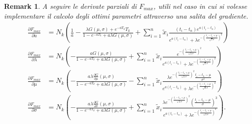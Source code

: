 \documentclass[10pt,a4paper]{report}
\newtheorem{remark}{Remark}
\begin{document}
\begin{remark}
A seguire le derivate parziali di $F_{max}$, utili nel caso in cui si volesse implementare il calcolo degli ottimi parametri attraverso una salita del gradiente.
\begin{align*}
\frac{\partial F_{max}}{\partial a} &= N_k\left(\frac{1}{a}-\frac{\lambda G(\mu,\sigma)+e^{-a T_k}T_k}{1-e^{-aT_k}+a\lambda G(\mu,\sigma)}+\sum_{i=1}^n\tilde{x}_i\frac{(t_i-t_n)e^{a(t_i-t_n)}}{e^{a(t_i-t_n)}+\lambda e^{-\left(\frac{t_i-t_n+\mu}{\sqrt{2}\sigma}\right)^2}}\right)\\
\frac{\partial F_{max}}{\partial \lambda} &= N_k\left(-\frac{a G(\mu,\sigma)}{1-e^{-aT_k}+a\lambda G(\mu,\sigma)}+\sum_{i=1}^n\tilde{x}_i\frac{e^{-\left(\frac{t_i-t_n+\mu}{\sqrt{2}\sigma}\right)^2}}{e^{a(t_i-t_n)}+\lambda e^{-\left(\frac{t_i-t_n+\mu}{\sqrt{2}\sigma}\right)^2}}\right)\\
\frac{\partial F_{max}}{\partial\mu} &= N_k\left(-\frac{a\lambda \frac{\partial G}{\partial\mu}(\mu,\sigma)}{1-e^{-aT_k}+a\lambda G(\mu,\sigma)}-\sum_{i=1}^n\tilde{x}_i\frac{\lambda e^{-\left(\frac{t_i-t_n+\mu}{\sqrt{2}\sigma}\right)^2}\frac{t_i-t_n-\mu}{\sigma^2}}{e^{a(t_i-t_n)}+\lambda e^{-\left(\frac{t_i-t_n+\mu}{\sqrt{2}\sigma}\right)^2}}\right)\\
\frac{\partial F_{max}}{\partial\sigma} &= N_k\left(-\frac{a\lambda \frac{\partial G}{\partial\sigma}(\mu,\sigma)}{1-e^{-aT_k}+a\lambda G(\mu,\sigma)}+\sum_{i=1}^n\tilde{x}_i\frac{\lambda e^{-\left(\frac{t_i-t_n+\mu}{\sqrt{2}\sigma}\right)^2}\left(\frac{t_i-t_n-\mu}{\sigma}\right)^3}{e^{a(t_i-t_n)}+\lambda e^{-\left(\frac{t_i-t_n+\mu}{\sqrt{2}\sigma}\right)^2}}\right).
\end{align*}
\end{remark}
\end{document}
